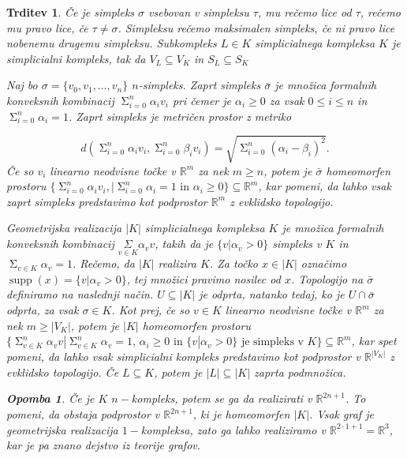 \documentclass[a4paper,12pt]{article}
\DeclareRobustCommand{\si}{
    \bar{\sigma}
}
\DeclareMathOperator*{\supp}{supp}
\newcommand\mymathop[1]{\mathop{\operatorname{#1}}}
\theoremstyle{definition}
\theoremstyle{plain}
\theoremstyle{definition}
\theoremstyle{plain}
\newtheorem{trditev}{Trditev}
\theoremstyle{plain}
\theoremstyle{plain}
\newtheorem{opomba}{Opomba}
\theoremstyle{plain}
\begin{document}
\begin{trditev}
Če je simpleks $\sigma$ vsebovan  v simpleksu $\tau$, mu rečemo \textit{lice} od $\tau$, rečemo mu \textit{pravo lice}, če $\tau\neq \sigma$. 
Simpleksu rečemo \textit{maksimalen simpleks}, če ni pravo lice nobenemu drugemu simpleksu. Subkompleks $L\in K$ simplicialnega kompleksa
 $K$ je simplicialni kompleks, tak da $V_L\subseteq V_K$ in $S_L\subseteq S_K$


Naj bo $\sigma = \{v_0,v_1,\ldots,v_n\}$ $n$-simpleks. Zaprt
simpleks $\bar{\sigma}$ je množica formalnih konveksnih kombinacij $\mymathop{\Sigma}_{i=0}^{n}\alpha_i v_i$
pri čemer je $\alpha_i \ge 0$ za vsak $0\le i \le n$ in $\mymathop{\Sigma}_{i=0}^{n}\alpha_i = 1$. Zaprt simpleks je metričen prostor z metriko

\begin{equation}
    \label{eq:metrika}    
d(\mymathop{\Sigma}_{i=0}^{n}\alpha_i v_i,\mymathop{\Sigma}_{i=0}^{n}\beta_i v_i) = \sqrt{\mymathop{\Sigma}_{i=0}^{n}(\alpha_i - \beta_i)^2}.
\end{equation}
Če so $v_i$ linearno neodvisne točke v $\mathbb{R}^m$ za nek $m\geq n$, potem je $\bar{\sigma}$ homeomorfen prostoru 
$\{\mymathop{\Sigma}_{i=0}^{n}\alpha_i v_i, | \mymathop{\Sigma}_{i=0}^{n}\alpha_i = 1 \text{ in } \alpha_i \ge 0 \}\subseteq \mathbb{R}^m$, 
kar pomeni, da lahko vsak zaprt simpleks predstavimo kot podprostor $\mathbb{R}^m$ z evklidsko topologijo.

\textit{Geometrijska realizacija} $|K|$ simplicialnega kompleksa $K$ je 
množica formalnih konveksnih kombinacij $\underset{v \in K}{\Sigma}\alpha_v v$, takih da je $\{v | \alpha_v > 0\}$ simpleks v $K$ in 
$\mymathop{\Sigma}_{v\in K}\alpha_v=1$. Rečemo, da $|K|$ realizira $K$. Za točko $x\in |K|$ označimo $\supp(x)=\{v | \alpha_v > 0\}$, 
tej množici pravimo nosilec od $x$. Topologijo na $\si$ definiramo na naslednji način. $U \subseteq |K|$ je odprta, natanko tedaj, ko je $U \cap 
\si$ odprta, za vsak $\sigma \in K$. Kot prej, če so $v\in K$ linearno neodvisne točke v $\mathbb{R}^m$ za nek $m\geq |V_K|$, potem je 
$|K|$ homeomorfen prostoru $\{\mymathop{\Sigma}_{v\in K}^{n}\alpha_v v | \mymathop{\Sigma}_{v\in K}^{n}\alpha_v = 1 \text{, } \alpha_i
\ge 0 \text{ in } \{v | \alpha_v > 0\} \text{ je simpleks v $K$}\} \subseteq \mathbb{R}^m$, kar spet pomeni, da lahko vsak simplicialni
kompleks predstavimo kot podprostor v $\mathbb{R}^{|V_K|}$ z evklidsko topologijo.
Če $L\subseteq K$, potem je $|L|\subseteq |K|$ zaprta podmnožica.

\begin{opomba}
    Če je $K$ $n-$kompleks, potem se ga da realizirati v $\mathbb{R}^{2n+1}$. To pomeni, da obstaja podprostor v
    $\mathbb{R}^{2n+1}$, ki je homeomorfen $|K|$. Vsak graf je geometrijska realizacija $1-$kompleksa, zato ga 
    lahko realiziramo v $\mathbb{R}^{2\cdot 1 +1}=\mathbb{R}^{3}$, kar je pa znano dejstvo iz teorije grafov.
\end{opomba}



\end{trditev}
\end{document}
